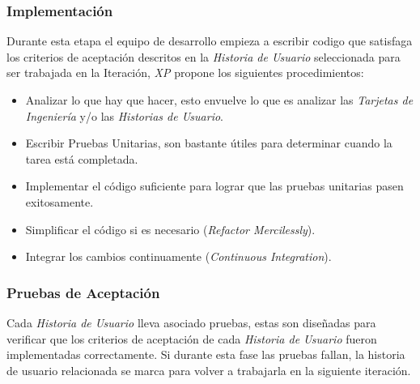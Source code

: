              \subsubsection{Implementación}

            Durante esta etapa el equipo de desarrollo empieza a escribir codigo que satisfaga los criterios de aceptación descritos en la \emph{Historia de Usuario} seleccionada para ser trabajada en la Iteración, \emph{XP} propone los siguientes procedimientos:


              \begin{itemize}
                \item Analizar lo que hay que hacer, esto envuelve lo que es analizar las \emph{Tarjetas de Ingeniería} y/o las \emph{Historias de Usuario}. %

                \item Escribir Pruebas Unitarias, son bastante útiles para determinar cuando la tarea está completada.

                \item Implementar el código suficiente para lograr que las pruebas unitarias pasen exitosamente.

                \item Simplificar el código si es necesario (\emph{Refactor Mercilessly}).

                \item Integrar los cambios continuamente (\emph{Continuous Integration}).

              \end{itemize}

\subsubsection{Pruebas de Aceptación}
              Cada \emph{Historia de Usuario} lleva asociado pruebas, estas son diseñadas para verificar que los criterios de aceptación de cada \emph{Historia de Usuario} fueron implementadas correctamente. Si durante esta fase las pruebas fallan, la historia de usuario relacionada se marca para volver a trabajarla en la siguiente iteración.\\


